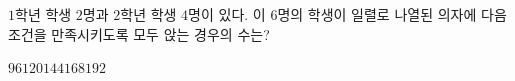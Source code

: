 $1$학년 학생 $2$명과 $2$학년 학생 $4$명이 있다. 이 $6$명의 학생이 일렬로 나열된 의자에 다음 조건을 만족시키도록 모두 앉는 경우의 수는? 
\begin{choices32}{$96$}{$120$}{$144$}{$168$}{$192$}\end{choices32}
